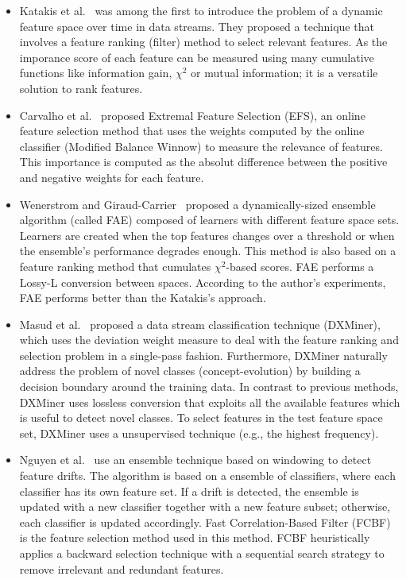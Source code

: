 \documentclass[preprint,12pt]{elsarticle}
\begin{document}
\begin{itemize}
	\item Katakis et al.~\cite{kata05} was among the first to introduce the problem of a dynamic feature space over time in data streams. They proposed a technique that involves a feature ranking (filter) method to select relevant features. As the imporance score of each feature can be measured using many cumulative functions like information gain, $\chi^2$ or mutual information; it is a versatile solution to rank features.
	\item Carvalho et al.~\cite{carva06} proposed Extremal Feature Selection (EFS), an online feature selection method that uses the weights computed by the online classifier (Modified Balance Winnow) to measure the relevance of features. This importance is computed as the absolut difference between the positive and negative weights for each feature.
	\item Wenerstrom and Giraud-Carrier~\cite{wener06} proposed a dynamically-sized ensemble algorithm (called FAE) composed of learners with different feature space sets. Learners are created when the top features changes over a threshold or when the ensemble's performance degrades enough. This method is also based on a feature ranking method that cumulates $\chi^2$-based scores. FAE performs a Lossy-L conversion between spaces. According to the author's experiments, FAE performs better than the Katakis's approach. %
	\item Masud et al.~\cite{masud10} proposed a data stream classification technique (DXMiner), which uses the deviation weight measure to deal with the feature ranking and selection problem in a single-pass fashion. Furthermore, DXMiner naturally address the problem of novel classes (concept-evolution) by building a decision boundary around the training data. In contrast to previous methods, DXMiner uses lossless conversion that exploits all the available features which is useful to detect novel classes. To select features in the test feature space set, DXMiner uses a unsupervised technique (e.g., the highest frequency).
	\item Nguyen et al.~\cite{nguyen12} use an ensemble technique based on windowing to detect feature drifts. The algorithm is based on a ensemble of classifiers, where each classifier has its own feature set. If a drift is detected, the ensemble is updated with a new classifier together with a new feature subset; otherwise, each classifier is updated accordingly. Fast Correlation-Based Filter (FCBF) is the feature selection method used in this method. FCBF heuristically applies a backward selection technique with a sequential search strategy to remove irrelevant and redundant features.

\end{itemize}
\end{document}
